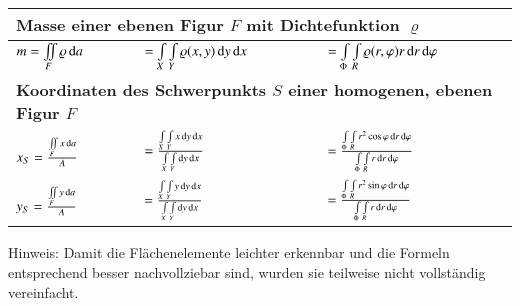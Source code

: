 {\begin{tabular}{|l|l|l|}
        \multicolumn{3}{|l|}{\bf{Masse einer ebenen Figur $F$ mit Dichtefunktion $\varrho$}} \\\hline
        $ m = \iint\limits_{F} \varrho \mathop{} \! \mathrm{d} a $ & 
        $ = \int\limits_{X}\int\limits_{Y} \varrho (x, y) \mathop{} \! \mathrm{d} y \mathop{} \! \mathrm{d} x $ &
        $ = \int\limits_{\Phi}\int\limits_{R} \varrho (r, \varphi) r \mathop{} \! \mathrm{d} r \mathop{} \! \mathrm{d} \varphi $ \\\hline

        \multicolumn{3}{|l|}{\bf{Koordinaten des Schwerpunkts $S$ einer homogenen, ebenen Figur $F$}} \\\hline
        $ x_{S} = \frac{\iint\limits_{F} x \mathop{} \! \mathrm{d} a}{A} $ & 
        $ = \frac{\int\limits_{X}\int\limits_{Y} x \mathop{} \! \mathrm{d} y \mathop{} \! \mathrm{d} x}{\int\limits_{X}\int\limits_{Y} \mathop{} \! \mathrm{d} y \mathop{} \! \mathrm{d} x} $ &
        $ = \frac{\int\limits_{\Phi}\int\limits_{R} r^2 \cos \varphi \mathop{} \! \mathrm{d} r \mathop{} \! \mathrm{d} \varphi}{\int\limits_{\Phi}\int\limits_{R} r \mathop{} \! \mathrm{d} r \mathop{} \! \mathrm{d} \varphi} $ \\
        $ y_{S} = \frac{\iint\limits_{F} y \mathop{} \! \mathrm{d} a}{A} $ & 
        $ = \frac{\int\limits_{X}\int\limits_{Y} y \mathop{} \! \mathrm{d} y \mathop{} \! \mathrm{d} x}{\int\limits_{X}\int\limits_{Y} \mathop{} \! \mathrm{d} y \mathop{} \! \mathrm{d} x} $ &
        $ = \frac{\int\limits_{\Phi}\int\limits_{R} r^2 \sin \varphi \mathop{} \! \mathrm{d} r \mathop{} \! \mathrm{d} \varphi}{\int\limits_{\Phi}\int\limits_{R} r \mathop{} \! \mathrm{d} r \mathop{} \! \mathrm{d} \varphi} $ \\\hline
    \end{tabular}
}
\smallskip
Hinweis: Damit die Flächenelemente leichter erkennbar und die Formeln entsprechend besser nachvollziebar sind, wurden sie teilweise nicht vollständig vereinfacht.
